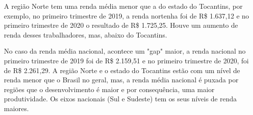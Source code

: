 \par A região Norte tem uma renda média menor que a do estado do Tocantins, por exemplo, no primeiro trimestre de 2019, a renda nortenha foi de R\$ 1.637,12 e no primeiro trimestre de 2020 o resultado de R\$ 1.725,25. Houve um aumento de renda desses trabalhadores, mas, abaixo do Tocantins.



\par No caso da renda média nacional, acontece um "gap" maior, a renda nacional no primeiro trimestre de 2019 foi de R\$ 2.159,51 e no primeiro trimestre de 2020, foi de R\$ 2.261,29. A região Norte e o estado do Tocantins estão com um nível de renda menor que o Brasil no geral, mas, a renda média nacional é puxada por regiões que o desenvolvimento é maior e por consequência, uma maior produtividade. Os eixos nacionais (Sul e Sudeste) tem os seus níveis de renda maiores.
